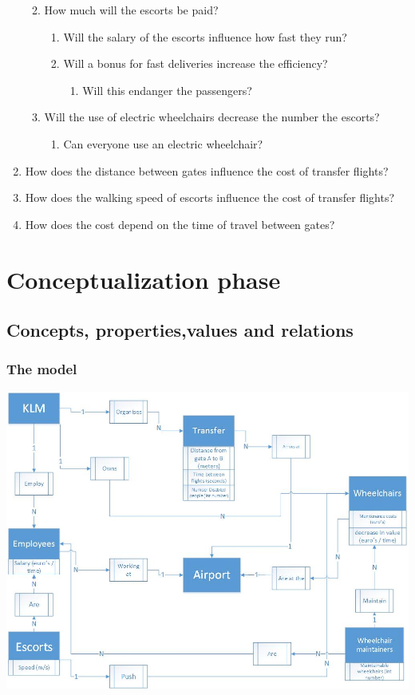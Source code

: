\documentclass[a4paper, 12pt, notitlepage]{report}
\begin{document}
\begin{enumerate}
\begin{enumerate}
\begin{enumerate}
		\end{enumerate}
	\item How much will the escorts be paid?
		\begin{enumerate}
		\item Will the salary of the escorts influence how fast they run?
		\item Will a bonus for fast deliveries increase the efficiency?
			\begin{enumerate}
			\item Will this endanger the passengers?
			\end{enumerate}
		\end{enumerate}
	\item Will the use of electric wheelchairs decrease the number the escorts?
		\begin{enumerate}
			\item Can everyone use an electric wheelchair?
		\end{enumerate}
	\end{enumerate}
		
\item How does the distance between gates influence the cost of transfer flights?
\item How does the walking speed of escorts influence the cost of transfer flights?
\item How does the cost depend on the time of travel between gates?
\end{enumerate}
\clearpage


\chapter{Conceptualization phase}
\section{Concepts, properties,values and relations}

\subsection{The model}
\includegraphics[scale=0.5]{figures/Conceptualmodel.jpg}
\clearpage
\end{document}
